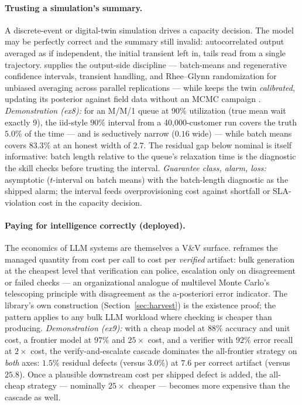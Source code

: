 \documentclass[11pt,a4paper]{article}
\begin{document}
\paragraph{Trusting a simulation's summary.} A discrete-event or
digital-twin simulation drives a capacity decision. The model may be
perfectly correct and the summary still invalid: autocorrelated output
averaged as if independent, the initial transient left in, tails read from
a single trajectory.  supplies the
output-side discipline --- batch-means and regenerative confidence
intervals, transient handling, and Rhee--Glynn randomization
\citep{asmussen2007,rhee2015} for unbiased averaging across parallel
replications --- while  keeps the
twin \emph{calibrated}, updating its posterior against field data without
an MCMC campaign \citep{elmoselhy2012,marzouk2016}.
\emph{Demonstration (ex8):} for an M/M/1 queue at $90\%$ utilization (true
mean wait exactly 9), the iid-style $90\%$ interval from a
40{,}000-customer run covers the truth $5.0\%$ of the time --- and is
seductively narrow ($0.16$ wide) --- while batch means covers $83.3\%$ at
an honest width of $2.7$. The residual gap below nominal is itself
informative: batch length relative to the queue's relaxation time is the
diagnostic the skill checks before trusting the interval.
\emph{Guarantee class, alarm, loss:} asymptotic ($t$-interval on batch
means) with the batch-length diagnostic as the shipped alarm; the interval
feeds overprovisioning cost against shortfall or SLA-violation cost in the
capacity decision.

\paragraph{Paying for intelligence correctly (deployed).} The economics of
LLM systems are themselves a V\&V surface. 
reframes the managed quantity from cost per call to cost per
\emph{verified} artifact: bulk generation at the cheapest level that
verification can police, escalation only on disagreement or failed checks
--- an organizational analogue of multilevel Monte Carlo's telescoping
principle \citep{giles2008,giles2015} with disagreement as the
a-posteriori error indicator. The library's own construction
(Section~\ref{sec:harvest}) is the existence proof; the pattern applies to
any bulk LLM workload where checking is cheaper than producing.
\emph{Demonstration (ex9):} with a cheap model at $88\%$ accuracy and unit
cost, a frontier model at $97\%$ and $25\times$ cost, and a verifier with
$92\%$ error recall at $2\times$ cost, the verify-and-escalate cascade
dominates the all-frontier strategy on \emph{both} axes: $1.5\%$ residual
defects (versus $3.0\%$) at $7.6$ per correct artifact (versus $25.8$).
Once a plausible downstream cost per shipped defect is added, the
all-cheap strategy --- nominally $25\times$ cheaper --- becomes more
expensive than the cascade as well.
\end{document}
